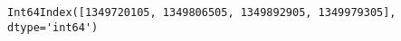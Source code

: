             \begin{tcolorbox}[breakable, size=fbox, boxrule=.5pt, pad at break*=1mm, opacityfill=0]
\begin{Verbatim}[commandchars=\\\{\}]
Int64Index([1349720105, 1349806505, 1349892905, 1349979305], dtype='int64')
\end{Verbatim}
\end{tcolorbox}
